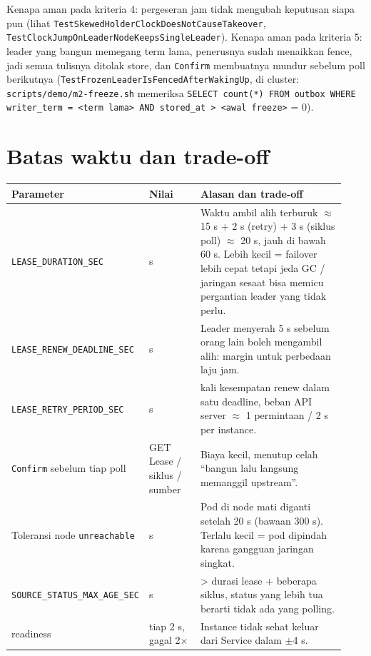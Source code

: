 Kenapa aman pada kriteria 4: pergeseran jam tidak mengubah keputusan siapa pun (lihat \texttt{Test\allowbreak{}Skewed\allowbreak{}Holder\allowbreak{}Clock\allowbreak{}Does\allowbreak{}Not\allowbreak{}Cause\allowbreak{}Takeover}, \texttt{Test\allowbreak{}Clock\allowbreak{}Jump\allowbreak{}On\allowbreak{}Leader\allowbreak{}Node\allowbreak{}Keeps\allowbreak{}Single\allowbreak{}Leader}). Kenapa aman pada kriteria 5: leader yang bangun memegang term lama, penerusnya sudah menaikkan fence, jadi semua tulisnya ditolak store, dan \texttt{Confirm} membuatnya mundur sebelum poll berikutnya (\texttt{Test\allowbreak{}Frozen\allowbreak{}Leader\allowbreak{}Is\allowbreak{}Fenced\allowbreak{}After\allowbreak{}Waking\allowbreak{}Up}, di cluster: \texttt{scripts/\allowbreak{}demo/\allowbreak{}m2-\allowbreak{}freeze.\allowbreak{}sh} memeriksa \texttt{SELECT count(*) FROM outbox WHERE writer\_\allowbreak{}term =\allowbreak{} <term lama> AND stored\_\allowbreak{}at > <awal freeze>} = 0).


\section{Batas waktu dan trade-off}

{\small
\begin{longtable}{@{}>{\raggedright\arraybackslash}p{0.173\linewidth}>{\raggedright\arraybackslash}p{0.179\linewidth}>{\raggedright\arraybackslash}p{0.582\linewidth}@{}}
\toprule
\textbf{Parameter} & \textbf{Nilai} & \textbf{Alasan dan trade-off} \\
\midrule
\endhead
\texttt{LEASE\_\allowbreak{}DURATION\_\allowbreak{}SEC} & 15 s & Waktu ambil alih terburuk $\approx$ 15 s + 2 s (retry) + 3 s (siklus poll) $\approx$ 20 s, jauh di bawah 60 s. Lebih kecil = failover lebih cepat tetapi jeda GC / jaringan sesaat bisa memicu pergantian leader yang tidak perlu. \\
\texttt{LEASE\_\allowbreak{}RENEW\_\allowbreak{}DEADLINE\_\allowbreak{}SEC} & 10 s & Leader menyerah 5 s sebelum orang lain boleh mengambil alih: margin untuk perbedaan laju jam. \\
\texttt{LEASE\_\allowbreak{}RETRY\_\allowbreak{}PERIOD\_\allowbreak{}SEC} & 2 s & 5 kali kesempatan renew dalam satu deadline, beban API server $\approx$ 1 permintaan / 2 s per instance. \\
\texttt{Confirm} sebelum tiap poll & 1 GET Lease / siklus / sumber & Biaya kecil, menutup celah ``bangun lalu langsung memanggil upstream''. \\
Toleransi node \texttt{unreachable} & 20 s & Pod di node mati diganti setelah 20 s (bawaan 300 s). Terlalu kecil = pod dipindah karena gangguan jaringan singkat. \\
\texttt{SOURCE\_\allowbreak{}STATUS\_\allowbreak{}MAX\_\allowbreak{}AGE\_\allowbreak{}SEC} & 30 s & > durasi lease + beberapa siklus, status yang lebih tua berarti tidak ada yang polling. \\
readiness & tiap 2 s, gagal 2$\times$ & Instance tidak sehat keluar dari Service dalam $\pm$4 s. \\
\bottomrule
\end{longtable}
}

